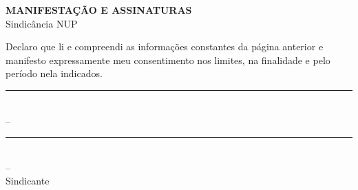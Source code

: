 \clearpage
\thispagestyle{empty}

\cabecalhoInstitucional

\vspace{1.5em}

\begin{center}
  \textbf{MANIFESTAÇÃO E ASSINATURAS}\\
  Sindicância NUP \getNup
\end{center}

\vspace{1.5em}

\noindent
Declaro que li e compreendi as informações constantes da página anterior e
manifesto expressamente meu consentimento nos limites, na finalidade e pelo
período nela indicados.

\vspace{1.5em}

\begin{flushright}
\tcpLocalData
\end{flushright}

\vspace{2.5em}

\begin{center}
\rule{9cm}{0.4pt}\\
\textbf{\tcpNome} -- \tcpPostoGraduacao\\
\tcpIdentificacaoAssinatura
\end{center}

\vspace{2.5em}

\begin{center}
\rule{9cm}{0.4pt}\\
\textbf{\getSindicanteNome} -- \getSindicantePosto\\
Sindicante
\end{center}

\clearpage
